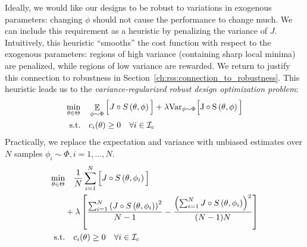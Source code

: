 Ideally, we would like our designs to be robust to variations in exogenous parameters: changing $\phi$ should not cause the performance to change much. We can include this requirement as a heuristic by penalizing the variance of $J$. Intuitively, this heuristic ``smooths'' the cost function with respect to the exogenous parameters: regions of high variance (containing sharp local minima) are penalized, while regions of low variance are rewarded. We return to justify this connection to robustness in Section~\ref{ch:rss:connection_to_robustness}. This heuristic leads us to the \textit{variance-regularized robust design optimization problem}:
\begin{subequations}\label{ch:rss:design_optimization_nlp_generic}
    \begin{align}
        \min_{\theta \in \Theta} & \quad \mathop{\mathbb{E}}_{\phi \sim \Phi} \Big[ J\circ S\left( \theta, \phi \right) \Big] + \lambda \rm{Var}_{\phi\sim\Phi}\Big[ J\circ S\left( \theta, \phi \right) \Big] \label{ch:rss:design_optimization_objective_generic} \\
        \text{s.t.}              & \quad c_i(\theta) \geq 0 \quad \forall i \in \mathcal{I}_c \label{ch:rss:design_optimization_constraints_generic}
    \end{align}
\end{subequations}
Practically, we replace the expectation and variance with unbiased estimates over $N$ samples $\phi_i \sim \Phi, i=1,\ldots,N$.
\begin{subequations}\label{ch:rss:design_optimization_nlp}
    \begin{align}
        \min_{\theta \in \Theta} & \quad \frac{1}{N}\sum_{i=1}^{N} \Big[J\circ S\left( \theta, \phi_i \right)\Big] \label{ch:rss:design_optimization_objective}                                              \\
                                 & + \lambda \left[ \frac{\sum_{i=1}^N \left( J\circ S\left( \theta, \phi_i \right) \right)^2}{N-1} - \frac{\left( \sum_{i=1}^N J\circ S\left( \theta, \phi_i \right) \right)^2}{(N-1)N} \right] \nonumber \\
        \text{s.t.}              & \quad c_i(\theta) \geq 0 \quad \forall i \in \mathcal{I}_c \label{ch:rss:design_optimization_constraints}
    \end{align}
\end{subequations}


